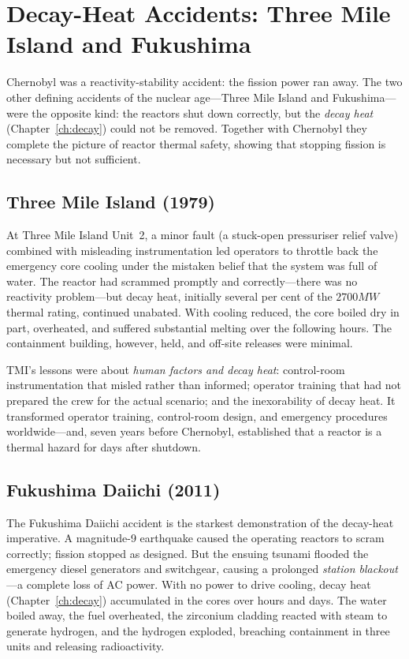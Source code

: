 \chapter{Decay-Heat Accidents: Three Mile Island and Fukushima}
\label{ch:decayheat-acc}

Chernobyl was a reactivity-stability accident: the fission power ran away. The two
other defining accidents of the nuclear age---Three Mile Island and
Fukushima---were the opposite kind: the reactors shut down correctly, but the
\emph{decay heat} (Chapter~\ref{ch:decay}) could not be removed. Together with
Chernobyl they complete the picture of reactor thermal safety, showing that
stopping fission is necessary but not sufficient.

\section{Three Mile Island (1979)}

At Three Mile Island Unit~2, a minor fault (a stuck-open pressuriser relief valve)
combined with misleading instrumentation led operators to throttle back the
emergency core cooling under the mistaken belief that the system was full of water.
The reactor had scrammed promptly and correctly---there was no reactivity
problem---but decay heat, initially several per cent of the $2700\unit{MW}$ thermal
rating, continued unabated. With cooling reduced, the core boiled dry in part,
overheated, and suffered substantial melting over the following hours. The
containment building, however, held, and off-site releases were minimal.

TMI's lessons were about \emph{human factors and decay heat}: control-room
instrumentation that misled rather than informed; operator training that had not
prepared the crew for the actual scenario; and the inexorability of decay heat. It
transformed operator training, control-room design, and emergency procedures
worldwide---and, seven years before Chernobyl, established that a reactor is a
thermal hazard for days after shutdown.

\section{Fukushima Daiichi (2011)}

The Fukushima Daiichi accident is the starkest demonstration of the decay-heat
imperative. A magnitude-9 earthquake caused the operating reactors to scram
correctly; fission stopped as designed. But the ensuing tsunami flooded the
emergency diesel generators and switchgear, causing a prolonged \emph{station
blackout}---a complete loss of AC power. With no power to drive cooling, decay heat
(Chapter~\ref{ch:decay}) accumulated in the cores over hours and days. The water
boiled away, the fuel overheated, the zirconium cladding reacted with steam to
generate hydrogen, and the hydrogen exploded, breaching containment in three units
and releasing radioactivity.

